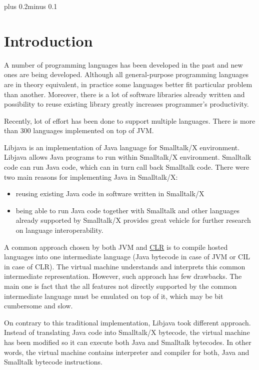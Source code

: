 \documentclass[11pt,twoside,a4paper]{book}
\let\Chapter\chapter
\def\chapter{\addtocontents{lol}{\protect\addvspace{10pt}}\Chapter}
\newcommand{\libjava}{{Libjava}}
\begin{document}
\tableofcontents
\listoffigures
\lstlistoflistings
\listoftables
\mainbodystarts
\normalfont
{}\baselineskip plus 0.2\baselineskip minus 0.1\baselineskip
\chapter{Introduction} 

A number of programming languages has been developed in the past and new ones are being developed. 
Although all general-purpose programming languages are in theory equivalent, in practice some languages better fit particular problem than another. 
Moreover, there is a lot of software libraries already written and possibility to reuse existing library greatly increases programmer's productivity. 

Recently, lot of effort has been done to support multiple languages. 
There is more than 300 languages implemented on top of JVM\cite{java-languages}.

\libjava{} is an implementation of Java language for Smalltalk/X environment. 
\libjava{} allows Java programs to run within Smalltalk/X environment. 
Smalltalk code can run Java code, which can in turn call back Smalltalk code. 
There were two main reasons for implementing Java in Smalltalk/X: 

\begin{itemize}
	\item reusing existing Java code in software written in Smalltalk/X
	\item being able to run Java code together with Smalltalk and other languages already supported by Smalltalk/X provides great vehicle for further research on language interoperability. 
\end{itemize}

A common approach chosen by both JVM and \href{http://msdn.microsoft.com/en-us/library/8bs2ecf4.aspx}{CLR} is to compile hosted languages into one intermediate language (Java bytecode in case of JVM or CIL in case of CLR).
The virtual machine understands and interprets this common intermediate representation.
However, such approach has few drawbacks. 
The main one is fact that the all features not directly supported by the common intermediate language must be emulated on top of it, which may be bit cumbersome and slow. 

On contrary to this traditional implementation, \libjava{} took different approach.
Instead of translating Java code into Smalltalk/X bytecode, the virtual machine has been modified so it can execute both Java and Smalltalk bytecodes. 
In other words, the virtual machine contains interpreter and compiler for both, Java and Smalltalk bytecode instructions. 
\end{document}
